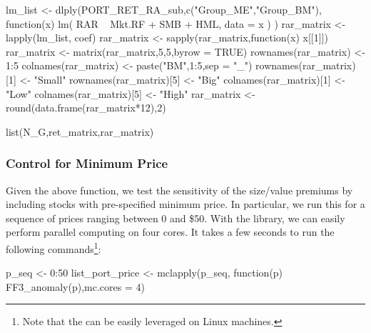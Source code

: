 \begin{Schunk}
\begin{Sinput}
{  
  lm_list <- dlply(PORT_RET_RA_sub,c("Group_ME","Group_BM"), 
                   function(x)  lm( RAR ~ Mkt.RF +  SMB +   HML, data = x   )    )  
  rar_matrix <- lapply(lm_list, coef)
  rar_matrix <- sapply(rar_matrix,function(x) x[[1]])
  rar_matrix <- matrix(rar_matrix,5,5,byrow = TRUE)
  rownames(rar_matrix) <- 1:5
  colnames(rar_matrix) <- paste("BM",1:5,sep = "_")
  rownames(rar_matrix)[1] <- "Small"
  rownames(rar_matrix)[5] <- "Big"
  colnames(rar_matrix)[1] <- "Low"
  colnames(rar_matrix)[5] <- "High"
  rar_matrix <- round(data.frame(rar_matrix*12),2)
  
  
  list(N_G,ret_matrix,rar_matrix)
  
}
\end{Sinput}
\end{Schunk}

\hypertarget{control-for-minimum-price}{%
\subsubsection{Control for Minimum
Price}\label{control-for-minimum-price}}

Given the above function, we test the sensitivity of the size/value
premiums by including stocks with pre-specified minimum price. In
particular, we run this for a sequence of prices ranging between 0 and
\$50. With the  library, we can easily perform parallel
computing on four cores. It takes a few seconds to run the following commands\footnote{Note that the  can be easily leveraged on Linux machines.}:
\begin{Schunk}
\begin{Sinput}
p_seq <- 0:50
list_port_price <- mclapply(p_seq, function(p) FF3_anomaly(p),mc.cores = 4)
\end{Sinput}
\end{Schunk}

